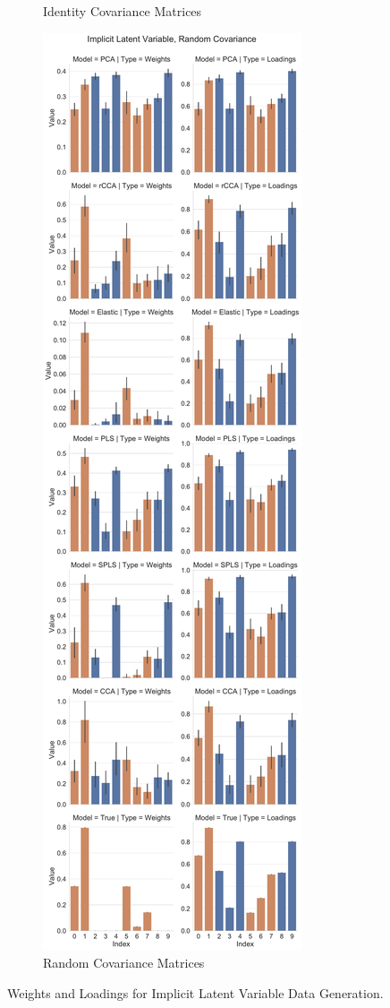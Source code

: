 \begin{figure}
\begin{subfigure}{0.49\linewidth}
\caption{Identity Covariance Matrices}
\end{subfigure}
%
\begin{subfigure}{0.49\linewidth}
\centering
\includegraphics[width=\linewidth]{figures/simulated/low/Combined_Weights_Loadings_with_Error_Bars_Random_Covariance_implicit}
\caption{Random Covariance Matrices}
\end{subfigure}
\caption{Weights and Loadings for Implicit Latent Variable Data Generation.}
\end{figure}

